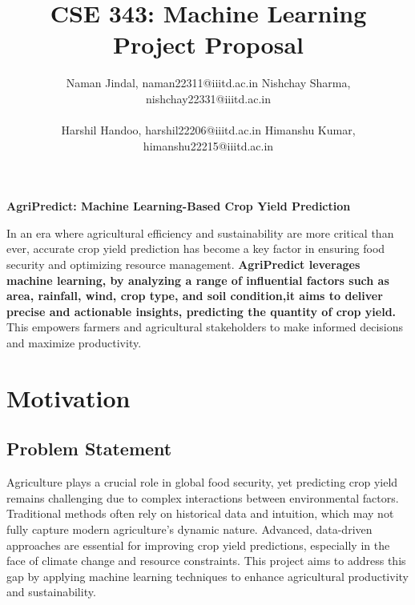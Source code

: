 \documentclass[10pt,twocolumn,letterpaper]{article}
\begin{document}
\title{\vspace{-5em}  CSE 343: Machine Learning Project Proposal \\ \vspace{-0.5em}}
\author{
Naman Jindal, naman22311@iiitd.ac.in \hspace{2em} %
Nishchay Sharma, nishchay22331@iiitd.ac.in \\
\vspace{0.3em} \\ %
Harshil Handoo, harshil22206@iiitd.ac.in \hspace{2em} %
Himanshu Kumar, himanshu22215@iiitd.ac.in
}

\maketitle

\begin{center}
    {\bf\LARGE AgriPredict: Machine Learning-Based Crop Yield Prediction}
\end{center}
\vspace{0 in} %


     In an era where agricultural efficiency and sustainability are more critical than ever, accurate crop yield prediction has become a key factor in ensuring food security and optimizing resource management. \textbf{AgriPredict leverages machine learning, by analyzing a range of influential factors such as area, rainfall, wind, crop type, and soil condition,it aims to deliver precise and actionable insights, predicting the quantity of crop yield.} This empowers farmers and agricultural stakeholders to make informed decisions and maximize productivity.



\section{Motivation}

\subsection{Problem Statement}

Agriculture plays a crucial role in global food security, yet predicting crop yield remains challenging due to complex interactions between environmental factors. Traditional methods often rely on historical data and intuition, which may not fully capture modern agriculture's dynamic nature. Advanced, data-driven approaches are essential for improving crop yield predictions, especially in the face of climate change and resource constraints. This project aims to address this gap by applying machine learning techniques to enhance agricultural productivity and sustainability.
\end{document}
